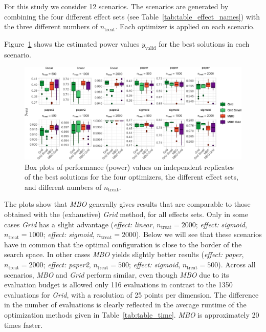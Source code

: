 \documentclass[bimj,fleqn]{w-art}
\theoremstyle{plain}
\theoremstyle{definition}
\begin{document}
For this study we consider 12 scenarios.
The scenarios are generated by combining the four different effect sets (see Table~\ref{tab:table_effect_names}) with the three different numbers of $n_{\text{treat}}$.
Each optimizer is applied on each scenario.

Figure~\ref{fig:plot_boxplot_valid_y} shows the estimated power values $y_{\text{valid}}$ for the best solutions in each scenario.
\begin{figure}[htb]
\centering
\includegraphics[width=\linewidth]{generated/figures/plot_boxplot_valid_y.pdf}
\caption{%
  Box plots of performance (power) values on independent replicates of the best solutions for the four optimizers, the different effect sets, and different numbers of $n_{\text{treat}}$.
  }
\label{fig:plot_boxplot_valid_y}
\end{figure}

The plots show that \emph{MBO} generally gives results that are comparable to those obtained with the (exhaustive) \emph{Grid} method, for all effects sets. 
Only in some cases \emph{Grid} has a slight advantage (\emph{effect: linear}, $n_{\text{treat}} = 2000$; \emph{effect: sigmoid}, $n_{\text{treat}} = 1000$; \emph{effect: sigmoid}, $n_{\text{treat}} = 2000$).
Below we will see that these scenarios have in common that the optimal configuration is close to the border of the search space. 
In other cases \emph{MBO} yields slightly better results (\emph{effect: paper}, $n_{\text{treat}} = 2000$; \emph{effect: paper2}, $n_{\text{treat}} = 500$; \emph{effect: sigmoid}, $n_{\text{treat}} = 500$).
Across all scenarios, \emph{MBO} and \emph{Grid} perform similar, even though \emph{MBO} due to its evaluation budget is allowed only 116 evaluations in contrast to the 1350 evaluations for \emph{Grid}, with a resolution of 25 points per dimension. 
The difference in the number of evaluations is clearly reflected in the average runtime of the optimization methods given in Table~\ref{tab:table_time}.
\emph{MBO} is approximately 20 times faster.

\end{document}
